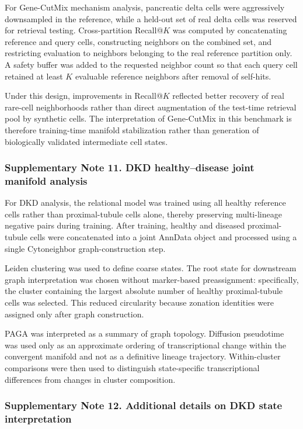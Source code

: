 \documentclass[11pt]{article}
\begin{document}
For Gene-CutMix mechanism analysis, pancreatic delta cells were aggressively downsampled in the reference, while a held-out set of real delta cells was reserved for retrieval testing. Cross-partition Recall@$K$ was computed by concatenating reference and query cells, constructing neighbors on the combined set, and restricting evaluation to neighbors belonging to the real reference partition only. A safety buffer was added to the requested neighbor count so that each query cell retained at least $K$ evaluable reference neighbors after removal of self-hits.

Under this design, improvements in Recall@$K$ reflected better recovery of real rare-cell neighborhoods rather than direct augmentation of the test-time retrieval pool by synthetic cells. The interpretation of Gene-CutMix in this benchmark is therefore training-time manifold stabilization rather than generation of biologically validated intermediate cell states.

\subsubsection*{Supplementary Note 11. DKD healthy--disease joint manifold analysis}

For DKD analysis, the relational model was trained using all healthy reference cells rather than proximal-tubule cells alone, thereby preserving multi-lineage negative pairs during training. After training, healthy and diseased proximal-tubule cells were concatenated into a joint AnnData object and processed using a single Cytoneighbor graph-construction step.

Leiden clustering was used to define coarse states. The root state for downstream graph interpretation was chosen without marker-based preassignment: specifically, the cluster containing the largest absolute number of healthy proximal-tubule cells was selected. This reduced circularity because zonation identities were assigned only after graph construction.

PAGA was interpreted as a summary of graph topology. Diffusion pseudotime was used only as an approximate ordering of transcriptional change within the convergent manifold and not as a definitive lineage trajectory. Within-cluster comparisons were then used to distinguish state-specific transcriptional differences from changes in cluster composition.

\subsubsection*{Supplementary Note 12. Additional details on DKD state interpretation}
\end{document}
